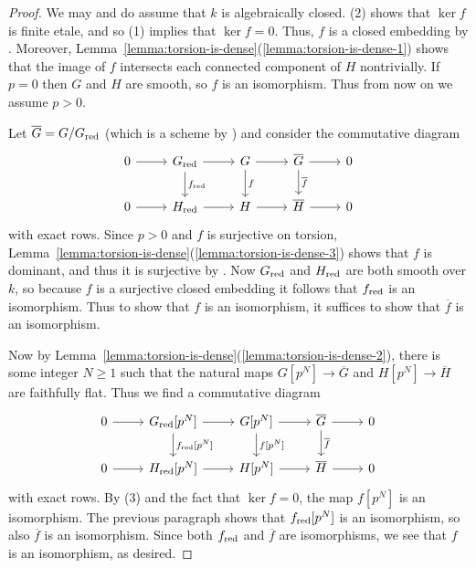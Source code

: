 \documentclass[11pt,reqno]{amsart}
\numberwithin{equation}{section}
\theoremstyle{definition}
\begin{document}
\begin{proof}
We may and do assume that $k$ is algebraically closed. (2) shows that $\ker f$ is finite etale, and so (1) implies that $\ker f = 0$. Thus, $f$ is a closed embedding by \cite[Exp.\ VI\textsubscript{B}, Cor.\ 1.4.2]{SGA3}. Moreover, Lemma~\ref{lemma:torsion-is-dense}(\ref{lemma:torsion-is-dense-1}) shows that the image of $f$ intersects each connected component of $H$ nontrivially. If $p = 0$ then $G$ and $H$ are smooth, so $f$ is an isomorphism. Thus from now on we assume $p > 0$. \smallskip

Let $\overline{G} = G/G_{\rm{red}}$ (which is a scheme by \cite[Exp.\ VI\textsubscript{A}, Thm.\ 3.2]{SGA3}) and consider the commutative diagram
\[
\begin{tikzcd}
0 \arrow[r]
    &G_{\rm{red}} \arrow[r] \arrow[d, "f_{\rm{red}}"]
    &G \arrow[r] \arrow[d, "f"]
    &\overline{G} \arrow[r] \arrow[d, "\overline{f}"]
    &0 \\
0 \arrow[r]
    &H_{\rm{red}} \arrow[r]
    &H \arrow[r]
    &\overline{H} \arrow[r]
    &0
\end{tikzcd}
\]
with exact rows. Since $p> 0$ and $f$ is surjective on torsion,  Lemma~\ref{lemma:torsion-is-dense}(\ref{lemma:torsion-is-dense-3}) shows that $f$ is dominant, and thus it is surjective by \cite[Exp.\ VI\textsubscript{B}, Prop.\ 1.2]{SGA3}. Now $G_{\rm{red}}$ and $H_{\rm{red}}$ are both smooth over $k$, so because $f$ is a surjective closed embedding it follows that $f_{\rm{red}}$ is an isomorphism. Thus to show that $f$ is an isomorphism, it suffices to show that $\overline{f}$ is an isomorphism. \smallskip

Now by Lemma~\ref{lemma:torsion-is-dense}(\ref{lemma:torsion-is-dense-2}), there is some integer $N \geq 1$ such that the natural maps $G[p^N] \to \overline{G}$ and $H[p^N] \to \overline{H}$ are faithfully flat. Thus we find a commutative diagram
\[
\begin{tikzcd}
0 \arrow[r]
    &G_{\rm{red}}[p^N] \arrow[r] \arrow[d, "f_{\rm{red}}{[p^N]}"]
    &G[p^N] \arrow[r] \arrow[d, "f{[p^N]}"]
    &\overline{G} \arrow[r] \arrow[d, "\overline{f}"]
    &0 \\
0 \arrow[r]
    &H_{\rm{red}}[p^N] \arrow[r]
    &H[p^N] \arrow[r]
    &\overline{H} \arrow[r]
    &0
\end{tikzcd}
\]
with exact rows. By (3) and the fact that $\ker f = 0$, the map $f[p^N]$ is an isomorphism. The previous paragraph shows that $f_{\rm{red}}[p^N]$ is an isomorphism, so also $\overline{f}$ is an isomorphism. Since both $f_{\rm{red}}$ and $\overline{f}$ are isomorphisms, we see that $f$ is an isomorphism, as desired.
\end{proof}
\end{document}
